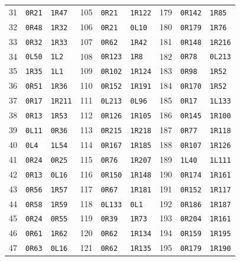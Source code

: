 \begin{longtable}{@{}rll@{\hspace{1.2em}}rll@{\hspace{1.2em}}rll@{}}
31 & \texttt{0R21} & \texttt{1R47} & 105 & \texttt{0R21} & \texttt{1R122} & 179 & \texttt{0R142} & \texttt{1R85}\\
32 & \texttt{0R48} & \texttt{1R32} & 106 & \texttt{0R21} & \texttt{0L10} & 180 & \texttt{0R179} & \texttt{1R76}\\
33 & \texttt{0R32} & \texttt{1R33} & 107 & \texttt{0R62} & \texttt{1R42} & 181 & \texttt{0R148} & \texttt{1R216}\\
34 & \texttt{0L50} & \texttt{1L2} & 108 & \texttt{0R123} & \texttt{1R8} & 182 & \texttt{0R78} & \texttt{0L213}\\
35 & \texttt{1R35} & \texttt{1L1} & 109 & \texttt{0R102} & \texttt{1R124} & 183 & \texttt{0R98} & \texttt{1R52}\\
36 & \texttt{0R51} & \texttt{1R36} & 110 & \texttt{0R152} & \texttt{1R191} & 184 & \texttt{0R170} & \texttt{1R52}\\
37 & \texttt{0R17} & \texttt{1R211} & 111 & \texttt{0L213} & \texttt{0L96} & 185 & \texttt{0R17} & \texttt{1L133}\\
38 & \texttt{0R13} & \texttt{1R53} & 112 & \texttt{0R126} & \texttt{1R105} & 186 & \texttt{0R145} & \texttt{1R100}\\
39 & \texttt{0L11} & \texttt{0R36} & 113 & \texttt{0R215} & \texttt{1R218} & 187 & \texttt{0R77} & \texttt{1R118}\\
40 & \texttt{0L4} & \texttt{1L54} & 114 & \texttt{0R167} & \texttt{1R185} & 188 & \texttt{0R107} & \texttt{1R126}\\
41 & \texttt{0R24} & \texttt{0R25} & 115 & \texttt{0R76} & \texttt{1R207} & 189 & \texttt{1L40} & \texttt{1L111}\\
42 & \texttt{0R13} & \texttt{0L16} & 116 & \texttt{0R150} & \texttt{1R148} & 190 & \texttt{0R174} & \texttt{1R161}\\
43 & \texttt{0R56} & \texttt{1R57} & 117 & \texttt{0R67} & \texttt{1R181} & 191 & \texttt{0R152} & \texttt{1R117}\\
44 & \texttt{0R58} & \texttt{1R59} & 118 & \texttt{0L133} & \texttt{0L1} & 192 & \texttt{0R186} & \texttt{1R187}\\
45 & \texttt{0R24} & \texttt{0R55} & 119 & \texttt{0R39} & \texttt{1R73} & 193 & \texttt{0R204} & \texttt{1R161}\\
46 & \texttt{0R61} & \texttt{1R62} & 120 & \texttt{0R62} & \texttt{1R134} & 194 & \texttt{0R159} & \texttt{1R195}\\
47 & \texttt{0R63} & \texttt{0L16} & 121 & \texttt{0R62} & \texttt{1R135} & 195 & \texttt{0R179} & \texttt{1R190}\\

\end{longtable}
